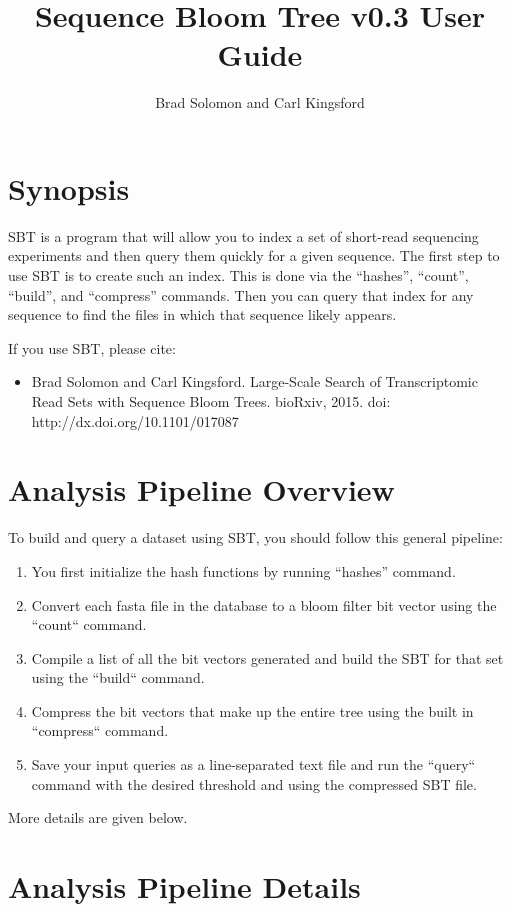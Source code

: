 \documentclass{article}
\title{Sequence Bloom Tree v0.3 User Guide}
\author{Brad Solomon and Carl Kingsford}
\begin{document}
\maketitle

\section{Synopsis}

SBT is a program that will allow you to index a set of short-read sequencing experiments and then query them quickly for a given sequence. The first step to use SBT is to create such an index. This is done via the ``hashes'', ``count'',  ``build'', and ``compress'' commands. Then you can query that index for any sequence to find the files in which that sequence likely appears.

If you use SBT, please cite:
\begin{itemize}
\item Brad Solomon and Carl Kingsford.
Large-Scale Search of Transcriptomic Read Sets with Sequence Bloom Trees. 
bioRxiv, 2015. doi: http://dx.doi.org/10.1101/017087
\end{itemize}

\section{Analysis Pipeline Overview}

To build and query a dataset using SBT, you should follow this general pipeline:
\begin{enumerate}
\item You first initialize the hash functions by running ``hashes'' command. 
\item Convert each fasta file in the database to a bloom filter bit vector using the  ``count`` command. 
\item Compile a list of all the bit vectors generated and build the SBT for that set using the ``build`` command.
\item Compress the bit vectors that make up the entire tree using the built in ``compress`` command.
\item Save your input queries as a line-separated text file and run the ``query`` command with the desired threshold and using the compressed SBT file.
\end{enumerate}
More details are given below.

\section{Analysis Pipeline Details}
\end{document}
